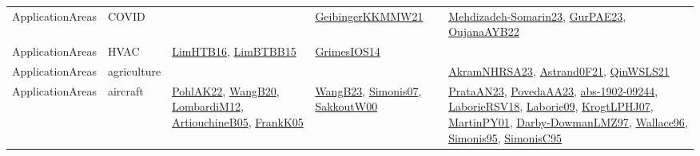 {\begin{longtable}{llp{6cm}p{6cm}p{6cm}}
ApplicationAreas & COVID &  & \href{papers/GeibingerKKMMW21.pdf}{GeibingerKKMMW21}\cite{GeibingerKKMMW21} & \href{papers/Mehdizadeh-Somarin23.pdf}{Mehdizadeh-Somarin23}\cite{Mehdizadeh-Somarin23}, \href{articles/GurPAE23.pdf}{GurPAE23}\cite{GurPAE23}, \href{papers/OujanaAYB22.pdf}{OujanaAYB22}\cite{OujanaAYB22}\\
ApplicationAreas & HVAC & \href{papers/LimHTB16.pdf}{LimHTB16}\cite{LimHTB16}, \href{papers/LimBTBB15.pdf}{LimBTBB15}\cite{LimBTBB15} & \href{articles/GrimesIOS14.pdf}{GrimesIOS14}\cite{GrimesIOS14} & \\
ApplicationAreas & agriculture &  &  & \href{articles/AkramNHRSA23.pdf}{AkramNHRSA23}\cite{AkramNHRSA23}, \href{papers/Astrand0F21.pdf}{Astrand0F21}\cite{Astrand0F21}, \href{articles/QinWSLS21.pdf}{QinWSLS21}\cite{QinWSLS21}\\
ApplicationAreas & aircraft & \href{articles/PohlAK22.pdf}{PohlAK22}\cite{PohlAK22}, \href{papers/WangB20.pdf}{WangB20}\cite{WangB20}, \href{articles/LombardiM12.pdf}{LombardiM12}\cite{LombardiM12}, \href{papers/ArtiouchineB05.pdf}{ArtiouchineB05}\cite{ArtiouchineB05}, \href{papers/FrankK05.pdf}{FrankK05}\cite{FrankK05} & \href{papers/WangB23.pdf}{WangB23}\cite{WangB23}, \href{articles/Simonis07.pdf}{Simonis07}\cite{Simonis07}, \href{articles/SakkoutW00.pdf}{SakkoutW00}\cite{SakkoutW00} & \href{articles/PrataAN23.pdf}{PrataAN23}\cite{PrataAN23}, \href{papers/PovedaAA23.pdf}{PovedaAA23}\cite{PovedaAA23}, \href{articles/abs-1902-09244.pdf}{abs-1902-09244}\cite{abs-1902-09244}, \href{articles/LaborieRSV18.pdf}{LaborieRSV18}\cite{LaborieRSV18}, \href{papers/Laborie09.pdf}{Laborie09}\cite{Laborie09}, \href{papers/KrogtLPHJ07.pdf}{KrogtLPHJ07}\cite{KrogtLPHJ07}, \href{articles/MartinPY01.pdf}{MartinPY01}\cite{MartinPY01}, \href{articles/Darby-DowmanLMZ97.pdf}{Darby-DowmanLMZ97}\cite{Darby-DowmanLMZ97}, \href{articles/Wallace96.pdf}{Wallace96}\cite{Wallace96}, \href{papers/Simonis95.pdf}{Simonis95}\cite{Simonis95}, \href{papers/SimonisC95.pdf}{SimonisC95}\cite{SimonisC95}\\

\end{longtable}}
